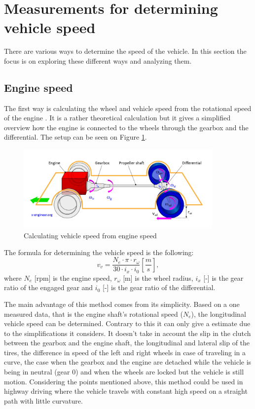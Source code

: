 \section{Measurements for determining vehicle speed}
\label{sec:Measurements}

There are various ways to determine the speed of the vehicle. In this section the focus is on exploring these different ways and analyzing them. 

\subsection{Engine speed}

The first way is calculating the wheel and vehicle speed from the rotational speed of the engine \cite{engine_speed}. It is a rather theoretical calculation but it gives a simplified overview how the engine is connected to the wheels through the gearbox and the differential. The setup can be seen on Figure \ref{fig:egine_speed}.
\FloatBarrier
\begin{figure}[h]
    \centering
    \includegraphics[width=0.9\textwidth]{images/Vehicle-longitudinal-powertrain-diagram-speed-calculation.png}
    \caption{Calculating vehicle speed from engine speed \cite{engine_speed}}
    \label{fig:egine_speed}
\end{figure}
\FloatBarrier
The formula for determining the vehicle speed is the following:
\begin{equation}
    v_v = \frac{N_e \cdot \pi \cdot r_{\omega}}{30 \cdot i_x \cdot i_0} \left[ \frac{m}{s} \right],
\end{equation}
where $N_e$ [rpm] is the engine speed, $r_{\omega}$ [m] is the wheel radius, $i_x$ [-] is the gear ratio of the engaged gear and $i_0$ [-] is the gear ratio of the differential. 

The main advantage of this method comes from its simplicity. Based on a one measured data, that is the engine shaft's rotational speed ($N_e$), the longitudinal vehicle speed can be determined. Contrary to this it can only give a estimate due to the simplifications it considers. It doesn't take in account the slip in the clutch between the gearbox and the engine shaft, the longitudinal and lateral slip of the tires, the difference in speed of the left and right wheels in case of traveling in a curve, the case when the gearbox and the engine are detached while the vehicle is being in neutral (gear 0) and when the wheels are locked but the vehicle is still motion. Considering the points mentioned above, this method could be used in highway driving where the vehicle travels with constant high speed on a straight path with little curvature. 

